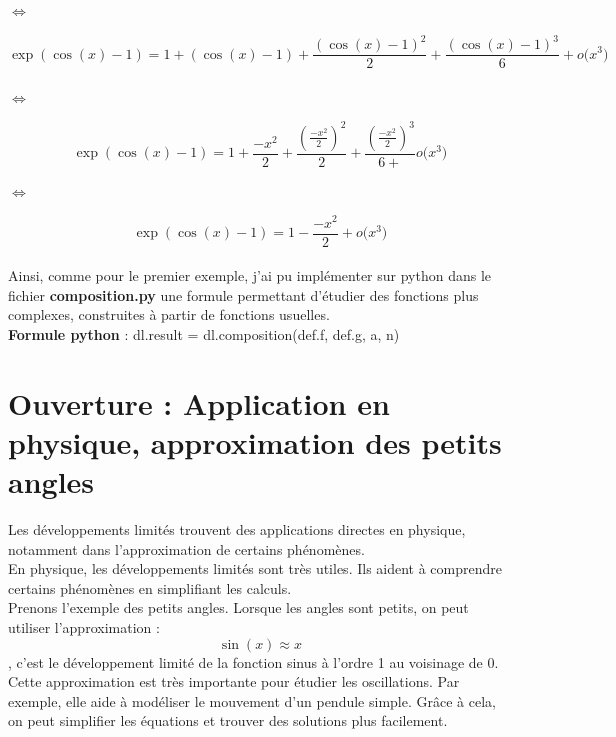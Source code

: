 \documentclass{article}
\begin{document}
$\Leftrightarrow$

$$\exp(\cos(x)-1) = 1+(\cos(x)-1)+\frac{(\cos(x)-1)^2}{2}+\frac{(\cos(x)-1)^3}{6}+o\big(x^3\big)$$ \\

$\Leftrightarrow$

$$\exp(\cos(x)-1) = 1+\frac{-x^2}{2}+\frac{(\frac{-x^2}{2})^2}{2}+\frac{(\frac{-x^2}{2})^3}{6+}o\big(x^3\big)$$ 

$\Leftrightarrow$

$$\exp(\cos(x)-1)=1-\frac{-x^2}{2}+o\big(x^3\big)$$ \\

Ainsi, comme pour le premier exemple, j'ai pu implémenter sur python dans le fichier \textbf{composition.py} une formule permettant d’étudier des fonctions plus complexes, construites à partir de fonctions usuelles. \\

\textbf{Formule python } : dl.result = dl.composition(def.f, def.g, a, n) \\


\section{Ouverture : Application en physique, approximation des petits angles}
Les développements limités trouvent des applications directes en physique, notamment dans l’approximation de certains phénomènes. \\

En physique, les développements limités sont très utiles. Ils aident à comprendre certains phénomènes en simplifiant les calculs.\\

Prenons l'exemple des petits angles. Lorsque les angles sont petits, on peut utiliser l'approximation : $$\sin(x) \approx x$$, c'est le développement limité de la fonction sinus à l'ordre 1 au voisinage de 0.\\

Cette approximation est très importante pour étudier les oscillations. Par exemple, elle aide à modéliser le mouvement d'un pendule simple. Grâce à cela, on peut simplifier les équations et trouver des solutions plus facilement.
\end{document}

